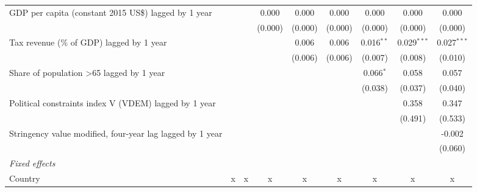 \begin{tabular}{lcccccccc}
   GDP per capita (constant 2015 US\$) lagged by 1 year                       &               &               & 0.000         & 0.000         & 0.000         & 0.000        & 0.000         & 0.000\\   
                                                                              &               &               & (0.000)       & (0.000)       & (0.000)       & (0.000)      & (0.000)       & (0.000)\\   
   Tax revenue (\% of GDP) lagged by 1 year                                   &               &               &               & 0.006         & 0.006         & 0.016$^{**}$ & 0.029$^{***}$ & 0.027$^{***}$\\   
                                                                              &               &               &               & (0.006)       & (0.006)       & (0.007)      & (0.008)       & (0.010)\\   
   Share of population >65 lagged by 1 year                                   &               &               &               &               &               & 0.066$^{*}$  & 0.058         & 0.057\\   
                                                                              &               &               &               &               &               & (0.038)      & (0.037)       & (0.040)\\   
   Political constraints index V (VDEM) lagged by 1 year                      &               &               &               &               &               &              & 0.358         & 0.347\\   
                                                                              &               &               &               &               &               &              & (0.491)       & (0.533)\\   
   Stringency value modified, four-year lag lagged by 1 year                  &               &               &               &               &               &              &               & -0.002\\   
                                                                              &               &               &               &               &               &              &               & (0.060)\\   
   \emph{Fixed effects}\\
   Country                                                                    & x             & x             & x             & x             & x             & x            & x             & x\\  

\end{tabular}
